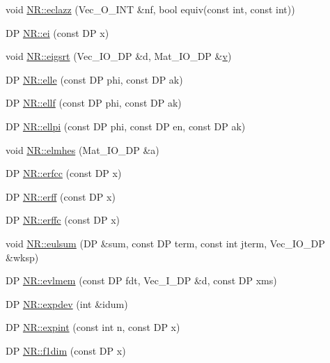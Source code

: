 \begin{DoxyCompactItemize}
\item 
void \mbox{\hyperlink{namespaceNR_ac02292b35dc1a4b253166611be75e6dd}{N\+R\+::eclazz}} (Vec\+\_\+\+O\+\_\+\+I\+NT \&nf, bool equiv(const int, const int))
\item 
DP \mbox{\hyperlink{namespaceNR_a28d2f7fc957866378bc8d49df208d5bc}{N\+R\+::ei}} (const DP x)
\item 
void \mbox{\hyperlink{namespaceNR_a47b470822fede3df423c4b65fd109d46}{N\+R\+::eigsrt}} (Vec\+\_\+\+I\+O\+\_\+\+DP \&d, Mat\+\_\+\+I\+O\+\_\+\+DP \&\mbox{\hyperlink{adat__devel_2lib_2hadron_2hadron__timeslice_8cc_a716fc87f5e814be3ceee2405ed6ff22a}{v}})
\item 
DP \mbox{\hyperlink{namespaceNR_a1762d8c42e9423b8290b196da5ed3b88}{N\+R\+::elle}} (const DP phi, const DP ak)
\item 
DP \mbox{\hyperlink{namespaceNR_a1571206bbdfafab7d95c23d356084050}{N\+R\+::ellf}} (const DP phi, const DP ak)
\item 
DP \mbox{\hyperlink{namespaceNR_ae61b03165ff02c431ab5a669537e6978}{N\+R\+::ellpi}} (const DP phi, const DP en, const DP ak)
\item 
void \mbox{\hyperlink{namespaceNR_a9dc23a1436a50ce9c28a541f92711f84}{N\+R\+::elmhes}} (Mat\+\_\+\+I\+O\+\_\+\+DP \&a)
\item 
DP \mbox{\hyperlink{namespaceNR_a6ebc6459d6bf176fe05cd0f33e37744b}{N\+R\+::erfcc}} (const DP x)
\item 
DP \mbox{\hyperlink{namespaceNR_a3dbd4e3cae13708e991a26347f305238}{N\+R\+::erff}} (const DP x)
\item 
DP \mbox{\hyperlink{namespaceNR_ab32cef5a592608701b19750c27605413}{N\+R\+::erffc}} (const DP x)
\item 
void \mbox{\hyperlink{namespaceNR_af6b58017e35503e394fd95ac85f8fbb7}{N\+R\+::eulsum}} (DP \&sum, const DP term, const int jterm, Vec\+\_\+\+I\+O\+\_\+\+DP \&wksp)
\item 
DP \mbox{\hyperlink{namespaceNR_acf9bcd45ac074c4fc27723f2093d332e}{N\+R\+::evlmem}} (const DP fdt, Vec\+\_\+\+I\+\_\+\+DP \&d, const DP xms)
\item 
DP \mbox{\hyperlink{namespaceNR_aa445323c2e4f1c7d6859208169d37307}{N\+R\+::expdev}} (int \&idum)
\item 
DP \mbox{\hyperlink{namespaceNR_a03af1157f0cf4a00d857e0dde2483104}{N\+R\+::expint}} (const int n, const DP x)
\item 
DP \mbox{\hyperlink{namespaceNR_a6c415158b378bbd03f785e29d8a7ac1f}{N\+R\+::f1dim}} (const DP x)
\item 

\end{DoxyCompactItemize}

